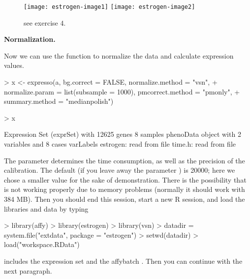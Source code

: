 \documentclass[a4paper]{article}
\begin{document}
\begin{exercises}
\begin{figure}[h]
\begin{center}	
  \texttt{[image: estrogen-image1]}
  \texttt{[image: estrogen-image2]}
  \caption{\label{estrogen-image} see exercise 4.}
 \end{center}
\end{figure}

\item {\bf Normalization.}  
\begin{exercise}
\item Now we can use the function  to normalize the
data and calculate expression values. 

\begin{Schunk}
\begin{Sinput}
> x <- expresso(a, bg.correct = FALSE, normalize.method = "vsn", 
+     normalize.param = list(subsample = 1000), pmcorrect.method = "pmonly", 
+     summary.method = "medianpolish")
\end{Sinput}
\end{Schunk}
\begin{Schunk}
\begin{Sinput}
> x
\end{Sinput}
\begin{Soutput}
Expression Set (exprSet) with 
	12625 genes
	8 samples
		 phenoData object with 2 variables and 8 cases
	 varLabels
		estrogen: read from file
		time.h: read from file
\end{Soutput}
\end{Schunk}

The parameter  determines the time consumption, as well as
the precision of the calibration. The default (if you leave away the parameter
) is 20000; here we chose a smaller
value for the sake of demonstration. There is the possibility that
 is not working properly due to  memory problems
(normally it should work with 384 MB). Then you should end this session, 
start a new R session, and load the libraries and data by typing
 
\begin{Schunk}
\begin{Sinput}
> library(affy)
> library(estrogen)
> library(vsn)
> datadir = system.file("extdata", package = "estrogen")
> setwd(datadir)
> load("workspace.RData")
\end{Sinput}
\end{Schunk}
 includes the expression set  and the 
affybatch . Then you can continue with the next paragraph.


\end{exercise}
\end{exercises}
\end{document}
